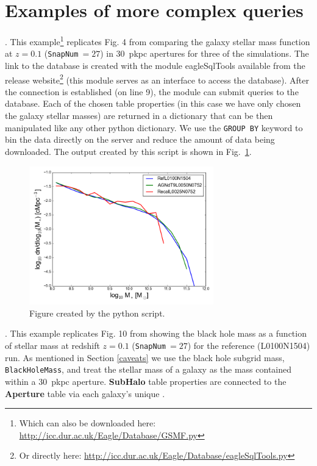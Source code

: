 \onecolumn

\section{Examples of more complex queries}
\label{example_scripts}
. This
example\footnote{Which can also be downloaded
here: \url{http://icc.dur.ac.uk/Eagle/Database/GSMF.py}} replicates Fig. 4
from \cite{Schaye2015} comparing the galaxy stellar mass function at $z=0.1$
({\tt SnapNum}$~=27$) in 30~pkpc apertures for three of the \eagle
simulations. The link to the database is created with the module {\sc
eagleSqlTools} available from the release website\footnote{Or directly here:
\url{http://icc.dur.ac.uk/Eagle/Database/eagleSqlTools.py}} (this module serves as an
interface to access the \eagle database). After the connection is established
(on line 9), the module can submit queries to the database. Each of the chosen
table properties (in this case we have only chosen the galaxy stellar masses)
are returned in a dictionary that can be then manipulated like any other {\sc
python} dictionary. We use the {\tt GROUP BY} \sql keyword to bin the data directly on the
server and reduce the amount of data being downloaded. The output created by this script is shown in
Fig.~\ref{fig:gsmf}.
\scriptsize
{}
\normalsize
\setcounter{figure}{0}
\begin{figure}[t]
\centering\includegraphics[width=8cm,angle=0]{example_scripts/GSMF}\vspace{-0.1cm}
\caption{Figure created by the {\sc python} script.}
\label{fig:gsmf}
\end{figure}
\normalsize
\FloatBarrier
\pagebreak

. This example
replicates Fig. 10 from \citet{Schaye2015} showing the black hole mass as a
function of stellar mass at redshift $z=0.1$ ({\tt SnapNum}$~=27$) for 
the reference (L0100N1504) run. As mentioned in Section \ref{caveats}
we use the black hole subgrid mass, {\tt BlackHoleMass}, and treat the stellar mass of a galaxy
as the mass contained within a 30~pkpc aperture. {\bf SubHalo} table properties are connected to the {\bf
Aperture} table via each galaxy's unique \GalaxyID. 

